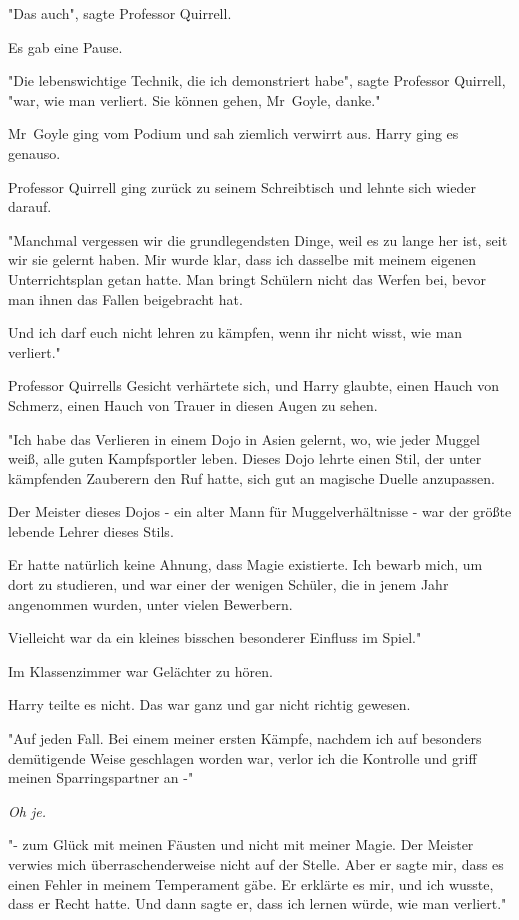 {"Das auch", sagte Professor Quirrell.

Es gab eine Pause.

"Die lebenswichtige Technik, die ich demonstriert habe", sagte Professor Quirrell, "war, wie man verliert. Sie können gehen, Mr~Goyle, danke."

Mr~Goyle ging vom Podium und sah ziemlich verwirrt aus. Harry ging es genauso.

Professor Quirrell ging zurück zu seinem Schreibtisch und lehnte sich wieder darauf.

"Manchmal vergessen wir die grundlegendsten Dinge, weil es zu lange her ist, seit wir sie gelernt haben. Mir wurde klar, dass ich dasselbe mit meinem eigenen Unterrichtsplan getan hatte. Man bringt Schülern nicht das Werfen bei, bevor man ihnen das Fallen beigebracht hat.

Und ich darf euch nicht lehren zu kämpfen, wenn ihr nicht wisst, wie man verliert."

Professor Quirrells Gesicht verhärtete sich, und Harry glaubte, einen Hauch von Schmerz, einen Hauch von Trauer in diesen Augen zu sehen.

"Ich habe das Verlieren in einem Dojo in Asien gelernt, wo, wie jeder Muggel weiß, alle guten Kampfsportler leben. Dieses Dojo lehrte einen Stil, der unter kämpfenden Zauberern den Ruf hatte, sich gut an magische Duelle anzupassen.

Der Meister dieses Dojos - ein alter Mann für Muggelverhältnisse - war der größte lebende Lehrer dieses Stils.

Er hatte natürlich keine Ahnung, dass Magie existierte. Ich bewarb mich, um dort zu studieren, und war einer der wenigen Schüler, die in jenem Jahr angenommen wurden, unter vielen Bewerbern.

Vielleicht war da ein kleines bisschen besonderer Einfluss im Spiel."

Im Klassenzimmer war Gelächter zu hören.

Harry teilte es nicht. Das war ganz und gar nicht richtig gewesen.

"Auf jeden Fall. Bei einem meiner ersten Kämpfe, nachdem ich auf besonders demütigende Weise geschlagen worden war, verlor ich die Kontrolle und griff meinen Sparringspartner an -"

\emph{Oh je.}

"- zum Glück mit meinen Fäusten und nicht mit meiner Magie. Der Meister verwies mich überraschenderweise nicht auf der Stelle. Aber er sagte mir, dass es einen Fehler in meinem Temperament gäbe. Er erklärte es mir, und ich wusste, dass er Recht hatte. Und dann sagte er, dass ich lernen würde, wie man verliert."

}
